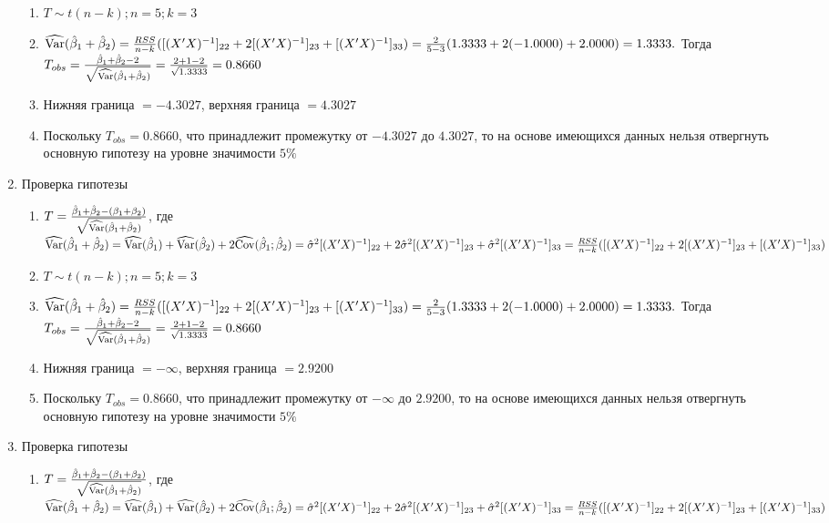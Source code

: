 \documentclass[pdftex,11pt,openany]{book}\usepackage[]{graphicx}\usepackage[]{color}
\begin{document}
\begin{solution}
\begin{enumerate}
\begin{enumerate}
\item $T \sim t(n-k); n = 5; k = 3$
\item $\widehat{\operatorname{Var}}(\hat{\beta}_1 + \hat{\beta}_2) = \frac{RSS}{n - k}([(X'X)^{-1}]_{22} + 2[(X'X)^{-1}]_{23} + [(X'X)^{-1}]_{33}) = \frac{2}{5 - 3} (1.3333 + 2(-1.0000) + 2.0000) = 1.3333.$ Тогда $T_{obs} = \frac{\hat{\beta}_1 + \hat{\beta}_2 - 2}{\sqrt{\widehat{\operatorname{Var}}(\hat{\beta}_1 + \hat{\beta}_2)}} = \frac{2 + 1 - 2}{\sqrt{1.3333}} = 0.8660$
\item Нижняя граница $= - 4.3027$, верхняя граница $= 4.3027$
\item Поскольку $T_{obs} = 0.8660$, что принадлежит промежутку от $- 4.3027$ до $4.3027$, то на основе имеющихся данных нельзя отвергнуть основную гипотезу на уровне значимости $5\%$
\end{enumerate}
\item Проверка гипотезы
\begin{enumerate}
\item $T = \frac{\hat{\beta}_1 + \hat{\beta}_2 - (\beta_1 + \beta_2)}{\sqrt{\widehat{\operatorname{Var}}(\hat{\beta}_1 + \hat{\beta}_2)}}$, где $\widehat{\operatorname{Var}}(\hat{\beta}_1 + \hat{\beta}_2) = \widehat{\operatorname{Var}}(\hat{\beta}_1) + \widehat{\operatorname{Var}}(\hat{\beta}_2) + 2\widehat{\operatorname{Cov}}(\hat{\beta}_1;\hat{\beta}_2) = \hat{\sigma}^2 [(X'X)^{-1}]_{22} + 2\hat{\sigma}^2 [(X'X)^{-1}]_{23} + \hat{\sigma}^2 [(X'X)^{-1}]_{33}= \frac{RSS}{n - k}([(X'X)^{-1}]_{22} + 2[(X'X)^{-1}]_{23} + [(X'X)^{-1}]_{33})$
\item $T \sim t(n-k); n = 5; k = 3$
\item $\widehat{\operatorname{Var}}(\hat{\beta}_1 + \hat{\beta}_2) = \frac{RSS}{n - k}([(X'X)^{-1}]_{22} + 2[(X'X)^{-1}]_{23} + [(X'X)^{-1}]_{33}) = \frac{2}{5 - 3} (1.3333 + 2(-1.0000) + 2.0000) = 1.3333.$ Тогда $T_{obs} = \frac{\hat{\beta}_1 + \hat{\beta}_2 - 2}{\sqrt{\widehat{\operatorname{Var}}(\hat{\beta}_1 + \hat{\beta}_2)}} = \frac{2 + 1 - 2}{\sqrt{1.3333}} = 0.8660$
\item Нижняя граница $= - \infty$, верхняя граница $= 2.9200$
\item Поскольку $T_{obs} = 0.8660$, что принадлежит промежутку от $- \infty$ до $2.9200$, то на основе имеющихся данных нельзя отвергнуть основную гипотезу на уровне значимости $5\%$
\end{enumerate}
\item Проверка гипотезы
\begin{enumerate}
\item $T = \frac{\hat{\beta}_1 + \hat{\beta}_2 - (\beta_1 + \beta_2)}{\sqrt{\widehat{\operatorname{Var}}(\hat{\beta}_1 + \hat{\beta}_2)}}$, где $\widehat{\operatorname{Var}}(\hat{\beta}_1 + \hat{\beta}_2) = \widehat{\operatorname{Var}}(\hat{\beta}_1) + \widehat{\operatorname{Var}}(\hat{\beta}_2) + 2\widehat{\operatorname{Cov}}(\hat{\beta}_1;\hat{\beta}_2) = \hat{\sigma}^2 [(X'X)^{-1}]_{22} + 2\hat{\sigma}^2 [(X'X)^{-1}]_{23} + \hat{\sigma}^2 [(X'X)^{-1}]_{33}= \frac{RSS}{n - k}([(X'X)^{-1}]_{22} + 2[(X'X)^{-1}]_{23} + [(X'X)^{-1}]_{33})$

\end{enumerate}
\end{enumerate}
\end{solution}
\end{document}
